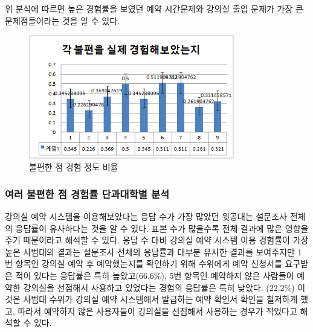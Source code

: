 \documentclass[11pt,a4paper]{article}
\begin{document}
위 분석에 따르면 높은 경험률을 보였던 예약 시간문제와 강의실 출입 문제가 가장 큰 문제점들이라는 것을 알 수 있다.
\begin{figure}[h]
\includegraphics[width=0.8\textwidth]{4_1_2}
\centering
\caption{불편한 점 경험 정도 비율}
\end{figure}

\subsubsection{여러 불편한 점 경험률 단과대학별 분석}
강의실 예약 시스템을 이용해보았다는 응답 수가 가장 많았던 윗공대는 설문조사
전체의 응답률이 유사하다는 것을 알 수 있다. 표본 수가 많을수록 전체 결과에 많은
영향을 주기 때문이라고 해석할 수 있다. 응답 수 대비 강의실 예약 시스템 이용
경험률이 가장 높은 사범대의 결과는 설문조사 전체의 응답률과 대부분 유사한
결과를 보여주지만 1번 항목인 강의실 예약 후 예약했는지를 확인하기 위해 수위에게
예약 신청서를 요구받은 적이 있다는 응답률은 특히 높았고(66.6\%), 5번 항목인
예약하지 않은 사람들이 예약한 강의실을 선점해서 사용하고 있었다는 경험의
응답률은 특히 낮았다. (22.2\%) 이것은 사범대 수위가 강의실 예약 시스템에서
발급하는 예약 확인서 확인을 철저하게 했고, 따라서 예약하지 않은 사용자들이
강의실을 선점해서 사용하는 경우가 적었다고 해석할 수 있다.
\end{document}
